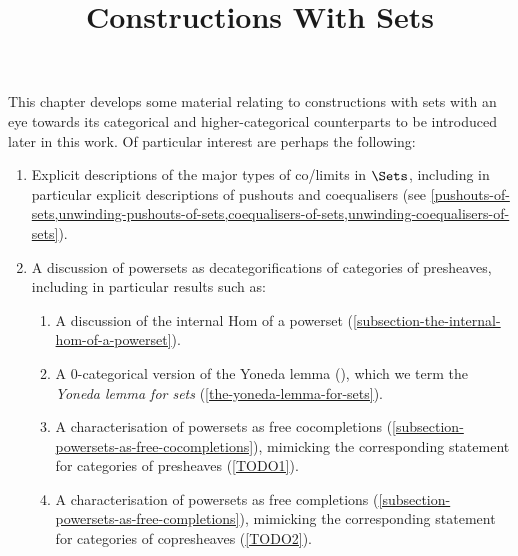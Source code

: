 

%



\title{Constructions With Sets}

\maketitle

\label{section-phantom}

This chapter develops some material relating to constructions with sets with an eye towards its categorical and higher-categorical counterparts to be introduced later in this work. Of particular interest are perhaps the following:
\begin{enumerate}
    \item\label{constructions-with-sets-introduction-item-1}Explicit descriptions of the major types of co/limits in $\Sets$, including in particular explicit descriptions of pushouts and coequalisers (see \cref{pushouts-of-sets,unwinding-pushouts-of-sets,coequalisers-of-sets,unwinding-coequalisers-of-sets}).
    \item\label{constructions-with-sets-introduction-item-2}A discussion of powersets as decategorifications of categories of presheaves, including in particular results such as:
        \begin{enumerate}
            \item\label{constructions-with-sets-introduction-item-2a}A discussion of the internal Hom of a powerset (\cref{subsection-the-internal-hom-of-a-powerset}).
            \item\label{constructions-with-sets-introduction-item-2b}A 0-categorical version of the Yoneda lemma (), which we term the \textit{Yoneda lemma for sets} (\cref{the-yoneda-lemma-for-sets}).
            \item\label{constructions-with-sets-introduction-item-2c}A characterisation of powersets as free cocompletions (\cref{subsection-powersets-as-free-cocompletions}), mimicking the corresponding statement for categories of presheaves (\cref{TODO1}).
            \item\label{constructions-with-sets-introduction-item-2d}A characterisation of powersets as free completions (\cref{subsection-powersets-as-free-completions}), mimicking the corresponding statement for categories of copresheaves (\cref{TODO2}).

\end{enumerate}
\end{enumerate}
